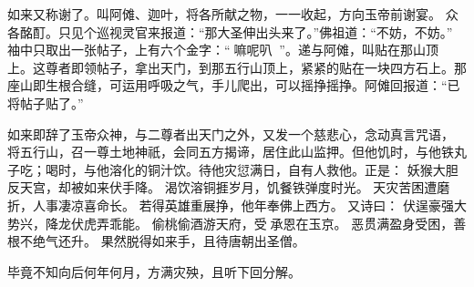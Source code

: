 如来又称谢了。叫阿傩、迦叶，将各所献之物，一一收起，方向玉帝前谢宴。
众各酩酊。只见个巡视灵官来报道：“那大圣伸出头来了。”佛祖道：“不妨，不妨。”
袖中只取出一张帖子，上有六个金字：“嘛呢叭”。递与阿傩，叫贴在那山顶
上。这尊者即领帖子，拿出天门，到那五行山顶上，紧紧的贴在一块四方石上。那
座山即生根合缝，可运用呼吸之气，手儿爬出，可以摇挣摇挣。阿傩回报道：“已
将帖子贴了。”

如来即辞了玉帝众神，与二尊者出天门之外，又发一个慈悲心，念动真言咒语，
将五行山，召一尊土地神祇，会同五方揭谛，居住此山监押。但他饥时，与他铁丸
子吃；喝时，与他溶化的铜汁饮。待他灾愆满日，自有人救他。正是：
妖猴大胆反天宫，却被如来伏手降。
渴饮溶铜捱岁月，饥餐铁弹度时光。
天灾苦困遭磨折，人事凄凉喜命长。
若得英雄重展挣，他年奉佛上西方。
又诗曰：
伏逞豪强大势兴，降龙伏虎弄乖能。
偷桃偷酒游天府，受承恩在玉京。
恶贯满盈身受困，善根不绝气还升。
果然脱得如来手，且待唐朝出圣僧。

毕竟不知向后何年何月，方满灾殃，且听下回分解。